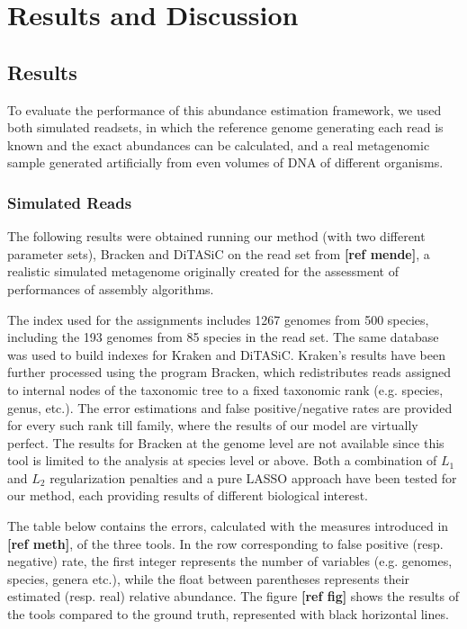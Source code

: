 
\chapter{Results and Discussion}
\label{Chapter4}

\section{Results}

To evaluate the performance of this abundance estimation framework, we used both simulated readsets, in which the reference genome generating each read is known and the exact abundances can be calculated, and a real metagenomic sample generated artificially from even volumes of DNA of different organisms.

\subsection{Simulated Reads}

The following results were obtained running our method (with two different parameter sets), Bracken and DiTASiC on the read set from \textbf{[ref mende]}, a realistic simulated metagenome originally created for the assessment of performances of assembly algorithms.

The index used for the assignments includes 1267 genomes from 500 species, including the 193 genomes from 85 species in the read set. The same database was used to build indexes for Kraken and DiTASiC. Kraken's results have been further processed using the program Bracken, which redistributes reads assigned to internal nodes of the taxonomic tree to a fixed taxonomic rank (e.g. species, genus, etc.). The error estimations and false positive/negative rates are provided for every such rank till family, where the results of our model are virtually perfect. The results for Bracken at the genome level are not available since this tool is limited to the analysis at species level or above. Both a combination of $L_1$ and $L_2$ regularization penalties and a pure LASSO approach have been tested for our method, each providing results of different biological interest.

The table below contains the errors, calculated with the measures introduced in \textbf{[ref meth]}, of the three tools. In the row corresponding to false positive (resp. negative) rate, the first integer represents the number of variables (e.g. genomes, species, genera etc.), while the float between parentheses represents their estimated (resp. real) relative abundance. The figure \textbf{[ref fig]} shows the results of the tools compared to the ground truth, represented with black horizontal lines.

